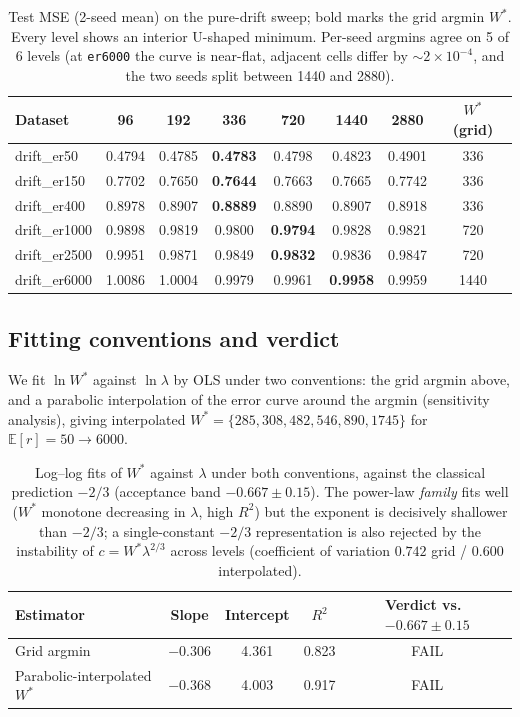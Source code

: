 \begin{table}[t]
\caption{Test MSE (2-seed mean) on the pure-drift sweep; bold marks the grid argmin $W^*$. Every level shows an interior U-shaped minimum. Per-seed argmins agree on 5 of 6 levels (at \texttt{er6000} the curve is near-flat, adjacent cells differ by $\sim 2{\times}10^{-4}$, and the two seeds split between 1440 and 2880).}
\label{tab:error_surface}
\centering\small
\begin{tabular}{lcccccc c}
\toprule
Dataset & 96 & 192 & 336 & 720 & 1440 & 2880 & $W^*$ (grid) \\
\midrule
drift\_er50 & 0.4794 & 0.4785 & \textbf{0.4783} & 0.4798 & 0.4823 & 0.4901 & 336 \\
drift\_er150 & 0.7702 & 0.7650 & \textbf{0.7644} & 0.7663 & 0.7665 & 0.7742 & 336 \\
drift\_er400 & 0.8978 & 0.8907 & \textbf{0.8889} & 0.8890 & 0.8907 & 0.8918 & 336 \\
drift\_er1000 & 0.9898 & 0.9819 & 0.9800 & \textbf{0.9794} & 0.9828 & 0.9821 & 720 \\
drift\_er2500 & 0.9951 & 0.9871 & 0.9849 & \textbf{0.9832} & 0.9836 & 0.9847 & 720 \\
drift\_er6000 & 1.0086 & 1.0004 & 0.9979 & 0.9961 & \textbf{0.9958} & 0.9959 & 1440 \\
\bottomrule
\end{tabular}
\end{table}

\subsection{Fitting conventions and verdict}

We fit $\ln W^*$ against $\ln \lambda$ by OLS under two conventions: the grid argmin above, and a parabolic interpolation of the error curve around the argmin (sensitivity analysis), giving interpolated $W^* = \{285, 308, 482, 546, 890, 1745\}$ for $\mathbb{E}[r] = 50 \to 6000$.

\begin{table}[t]
\caption{Log--log fits of $W^*$ against $\lambda$ under both conventions, against the classical prediction $-2/3$ (acceptance band $-0.667 \pm 0.15$). The power-law \emph{family} fits well ($W^*$ monotone decreasing in $\lambda$, high $R^2$) but the exponent is decisively shallower than $-2/3$; a single-constant $-2/3$ representation is also rejected by the instability of $c = W^* \lambda^{2/3}$ across levels (coefficient of variation $0.742$ grid / $0.600$ interpolated).}
\label{tab:powerlaw_fit}
\centering\small
\begin{tabular}{lcccc}
\toprule
Estimator & Slope & Intercept & $R^2$ & Verdict vs.\ $-0.667 \pm 0.15$ \\
\midrule
Grid argmin & $-0.306$ & 4.361 & 0.823 & FAIL \\
Parabolic-interpolated $W^*$ & $-0.368$ & 4.003 & 0.917 & FAIL \\
\bottomrule
\end{tabular}
\end{table}

